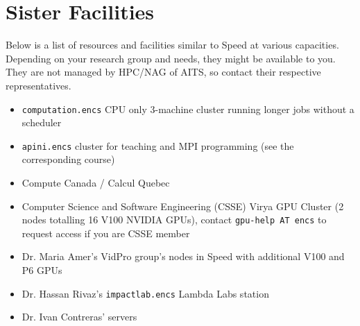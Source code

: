 \documentclass{easychair}
\begin{document}
\section{Sister Facilities}

Below is a list of resources and facilities similar to Speed at various capacities.
Depending on your research group and needs, they might be available to you. They
are not managed by HPC/NAG of AITS, so contact their respective representatives.

\begin{itemize}
\item
\texttt{computation.encs} CPU only 3-machine cluster running longer jobs
without a scheduler
\item
\texttt{apini.encs} cluster for teaching and MPI programming (see the corresponding
course)
\item
Compute Canada / Calcul Quebec
\item
Computer Science and Software Engineering (CSSE) Virya GPU Cluster
(2 nodes totalling 16 V100 NVIDIA GPUs), contact \texttt{gpu-help AT encs}
to request access if you are CSSE member
\item
Dr. Maria Amer's VidPro group's nodes in Speed with additional V100 and P6 GPUs
\item
Dr. Hassan Rivaz's \texttt{impactlab.encs} Lambda Labs station
\item
Dr. Ivan Contreras' servers
\end{itemize}


%
\nocite{aosa-book-vol1}
\label{sect:bib}

%
%
%


\end{document}
